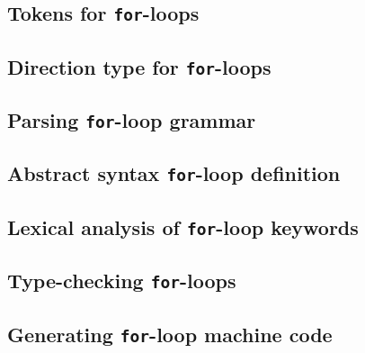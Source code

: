 \subsection{Tokens for {\tt for}-loops}
\label{ch:appendix|sec:code|sub:forloop-tokens}


\subsection{Direction type for {\tt for}-loops}
\label{ch:appendix|sec:code|sub:forloop-dirtype}


\subsection{Parsing {\tt for}-loop grammar}
\label{ch:appendix|sec:code|sub:forloop-grammar}


\subsection{Abstract syntax {\tt for}-loop definition}
\label{ch:appendix|sec:code|sub:forloop-absyn}


\subsection{Lexical analysis of {\tt for}-loop keywords}
\label{ch:appendix|sec:code|sub:forloop-lex}


\subsection{Type-checking {\tt for}-loops}
\label{ch:appendix|sec:code|sub:forloop-type}


\subsection{Generating {\tt for}-loop machine code}
\label{ch:appendix|sec:code|sub:forloop-machinecode}

